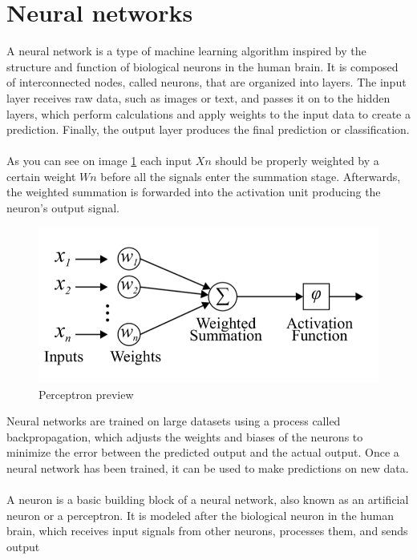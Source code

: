 \section{Neural networks} \label{sec:nn}
A neural network is a type of machine learning algorithm inspired by the structure and function of biological neurons in the human brain.
It is composed of interconnected nodes, called neurons, that are organized into layers. The input layer receives raw data, such as images or text, and
passes it on to the hidden layers, which perform calculations and apply weights to the input data to create a prediction. Finally, the output layer
produces the final prediction or classification.\\
\\
As you can see on image \ref{fig:perceptron} each input $Xn$ should be properly weighted by a certain weight $Wn$ before all the signals enter the
summation stage. Afterwards, the weighted summation is forwarded into the activation unit producing the neuron’s output signal.
\begin{center}
    \begin{figure}[!ht]
        \centering
        \includegraphics[width=1\textwidth]{figures/nn}
        \caption{Perceptron preview \cite{Mourgias-Alexandris:19}}
        \label{fig:perceptron}
    \end{figure}
\end{center}
Neural networks are trained on large datasets using a process called backpropagation, which adjusts the weights and biases of the neurons to minimize the
error between the predicted output and the actual output. Once a neural network has been trained, it can be used to make predictions on new data.\\
\\
A neuron is a basic building block of a neural network, also known as an artificial neuron or a perceptron.
It is modeled after the biological neuron in the human brain, which receives input signals from other neurons, processes them, and sends output
